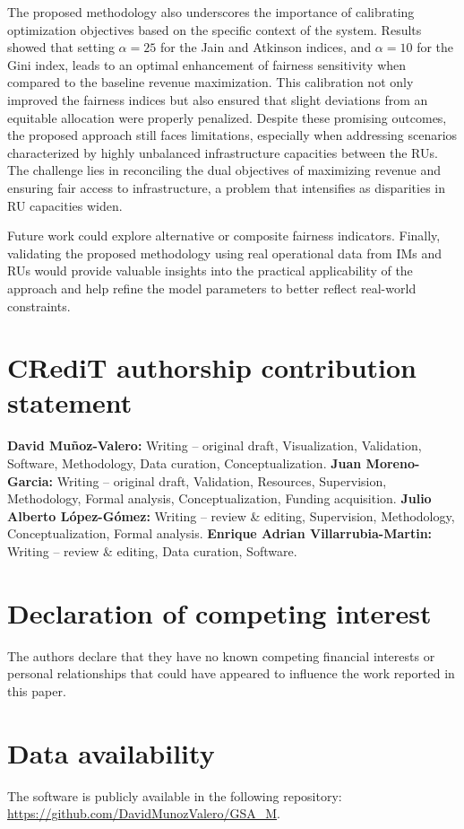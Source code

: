 \documentclass[preprint,12pt]{elsarticle}
\begin{document}
The proposed methodology also underscores the importance of calibrating optimization objectives based on the specific context of the system. Results showed that setting $\alpha=25$ for the Jain and Atkinson indices, and $\alpha=10$ for the Gini index, leads to an optimal enhancement of fairness sensitivity when compared to the baseline revenue maximization. This calibration not only improved the fairness indices but also ensured that slight deviations from an equitable allocation were properly penalized. Despite these promising outcomes, the proposed approach still faces limitations, especially when addressing scenarios characterized by highly unbalanced infrastructure capacities between the \glspl{RU}. The challenge lies in reconciling the dual objectives of maximizing revenue and ensuring fair access to infrastructure, a problem that intensifies as disparities in RU capacities widen.

Future work could explore alternative or composite fairness indicators. Finally, validating the proposed methodology using real operational data from \glspl{IM} and \glspl{RU} would provide valuable insights into the practical applicability of the approach and help refine the model parameters to better reflect real-world constraints.


\section*{CRediT authorship contribution statement}
\textbf{David Muñoz-Valero:} Writing – original draft, Visualization, Validation, Software, Methodology, Data curation, Conceptualization. \textbf{Juan Moreno-Garcia:} Writing – original draft, Validation, Resources, Supervision, Methodology, Formal analysis, Conceptualization, Funding acquisition. \textbf{Julio Alberto López-Gómez:} Writing – review \& editing, Supervision, Methodology, Conceptualization, Formal analysis. \textbf{Enrique Adrian Villarrubia-Martin:} Writing – review \& editing, Data curation, Software. 


\section*{Declaration of competing interest}
The authors declare that they have no known competing financial interests or personal relationships that could have appeared to influence the work reported in this paper.


\section*{Data availability}
The software is publicly available in the following repository: \url{https://github.com/DavidMunozValero/GSA_M}.
\end{document}
